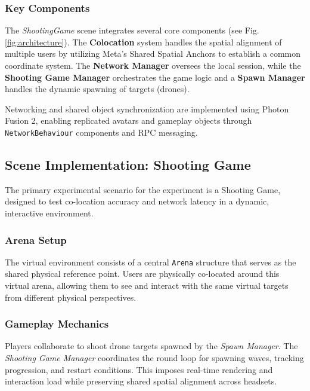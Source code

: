 \documentclass[conference]{IEEEtran}
\begin{document}
\subsubsection{Key Components}
The \textit{ShootingGame} scene integrates several core components (see Fig. \ref{fig:architecture}). The \textbf{Colocation} system handles the spatial alignment of multiple users by utilizing Meta's Shared Spatial Anchors\cite{MetaSharedSpatialAnchors2025} to establish a common coordinate system. The \textbf{Network Manager} oversees the local session, while the \textbf{Shooting Game Manager} orchestrates the game logic and a \textbf{Spawn Manager} handles the dynamic spawning of targets (drones).

Networking and shared object synchronization are implemented using Photon Fusion 2\cite{PhotonFusionDocs,MetaMultiplayerBuildingBlocks2025}, enabling replicated avatars and gameplay objects through \texttt{NetworkBehaviour} components and RPC messaging.



\subsection{Scene Implementation: Shooting Game}

The primary experimental scenario for the experiment is a Shooting Game, designed to test co-location accuracy and network latency in a dynamic, interactive environment.

\subsubsection{Arena Setup}

The virtual environment consists of a central \texttt{Arena} structure that serves as the shared physical reference point. Users are physically co-located around this virtual arena, allowing them to see and interact with the same virtual targets from different physical perspectives.

\subsubsection{Gameplay Mechanics}
Players collaborate to shoot drone targets spawned by the \textit{Spawn Manager}. The \textit{Shooting Game Manager} coordinates the round loop for spawning waves, tracking progression, and restart conditions. This imposes real-time rendering and interaction load while preserving shared spatial alignment across headsets.
\end{document}
